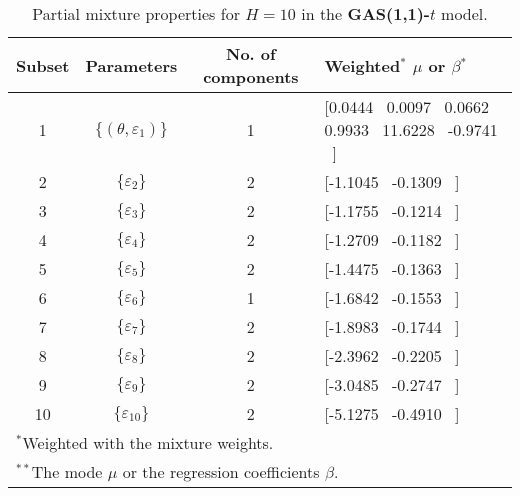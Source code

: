 \footnotesize{  
{ \renewcommand{\arraystretch}{1.3} 
\begin{longtable}{cccp{3.6cm}} 
\caption{Partial mixture properties for $H=10$ in the \textbf{GAS(1,1)-$t$} model.} 
\label{tab:pmits_t_gas} \\ 
 Subset & Parameters & No. of components  & Weighted$^{*}$ $\mu$ or $\beta$$^{*}$ \\ \hline 
1 & $\{(\theta,\varepsilon_{1})\}$ & 1 & [0.0444 \, 0.0097 \, 0.0662 \, 0.9933 \, 11.6228 \, -0.9741 \, ]   \\ [1ex] 
2 & $\{\varepsilon_{2}\}$ & 2 & [-1.1045 \, -0.1309 \, ]   \\ [1ex] 
3 & $\{\varepsilon_{3}\}$ & 2 & [-1.1755 \, -0.1214 \, ]   \\ [1ex] 
4 & $\{\varepsilon_{4}\}$ & 2 & [-1.2709 \, -0.1182 \, ]   \\ [1ex] 
5 & $\{\varepsilon_{5}\}$ & 2 & [-1.4475 \, -0.1363 \, ]   \\ [1ex] 
6 & $\{\varepsilon_{6}\}$ & 1 & [-1.6842 \, -0.1553 \, ]   \\ [1ex] 
7 & $\{\varepsilon_{7}\}$ & 2 & [-1.8983 \, -0.1744 \, ]   \\ [1ex] 
8 & $\{\varepsilon_{8}\}$ & 2 & [-2.3962 \, -0.2205 \, ]   \\ [1ex] 
9 & $\{\varepsilon_{9}\}$ & 2 & [-3.0485 \, -0.2747 \, ]   \\ [1ex] 
10 & $\{\varepsilon_{10}\}$ & 2 & [-5.1275 \, -0.4910 \, ]   \\ [1ex] 
\hline 
 \multicolumn{4}{l}{\footnotesize{$^{*}$Weighted with the mixture weights.}} \\ 
 \multicolumn{4}{l}{\footnotesize{$^{**}$The mode $\mu$ or the regression coefficients $\beta$.}} \\ 
\end{longtable} 
} 
} 
